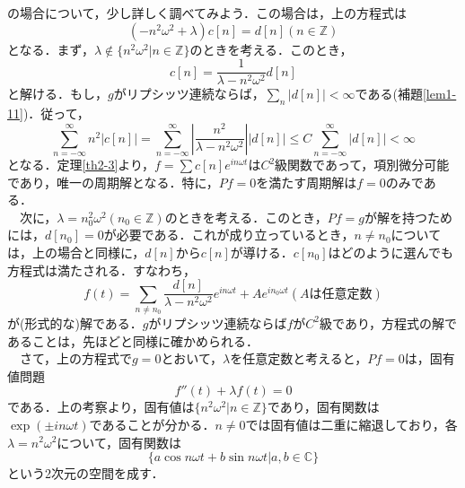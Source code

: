 \documentclass[a4j]{jsbook}
\numberwithin{theorem}{chapter}  %
\begin{document}
の場合について，少し詳しく調べてみよう．この場合は，上の方程式は
\begin{equation*}
    (-n^2\omega^2+\lambda)c[n]=d[n] (n\in\mathbb{Z})
\end{equation*}
となる．まず，\(\lambda\notin\{n^2\omega^2|n\in\mathbb{Z}\}\)のときを考える．このとき，
\begin{equation*}
    c[n]=\frac{1}{\lambda-n^2\omega^2}d[n]
\end{equation*}
と解ける．もし，\(g\)がリプシッツ連続ならば，\(\displaystyle\sum_n |d[n]|<\infty\)である(補題\ref{lem1-11})．従って，
\begin{equation*}
    \sum_{n=-\infty}^\infty n^2|c[n]|=\sum_{n=-\infty}^\infty\left|\frac{n^2}{\lambda-n^2\omega^2}\right||d[n]|\leq C\sum_{n=-\infty}^\infty |d[n]|<\infty
\end{equation*}
となる．定理\ref{th2-3}より，\(\displaystyle f=\sum c[n]e^{in\omega t}\)は\(C^2\)級関数であって，項別微分可能であり，唯一の周期解となる．特に，\(Pf=0\)を満たす周期解は\(f=0\)のみである．\\
　次に，\(\lambda=n_0^2\omega^2(n_0\in\mathbb{Z})\)のときを考える．このとき，\(Pf=g\)が解を持つためには，\(d[n_0]=0\)が必要である．これが成り立っているとき，\(n\neq n_0\)については，上の場合と同様に，\(d[n]\)から\(c[n]\)が導ける．\(c[n_0]\)はどのように選んでも方程式は満たされる．すなわち，
\begin{equation*}
    f(t)=\sum_{n\neq n_0}\frac{d[n]}{\lambda-n^2\omega^2}e^{in\omega t}+Ae^{in_0\omega t}(A\mbox{は任意定数})
\end{equation*}
が(形式的な)解である．\(g\)がリプシッツ連続ならば\(f\)が\(C^2\)級であり，方程式の解であることは，先ほどと同様に確かめられる．\\
　さて，上の方程式で\(g=0\)とおいて，\(\lambda\)を任意定数と考えると，\(Pf=0\)は，固有値問題
\begin{equation*}
    f''(t)+\lambda f(t)=0
\end{equation*}
である．上の考察より，固有値は\(\{n^2\omega^2|n\in\mathbb{Z}\}\)であり，固有関数は\(\exp(\pm in\omega t)\)であることが分かる．\(n\neq 0\)では固有値は二重に縮退しており，各\(\lambda=n^2\omega^2\)について，固有関数は
\begin{equation*}
    \{a\cos n\omega t+b\sin n\omega t|a, b\in\mathbb{C}\}
\end{equation*}
という2次元の空間を成す．
\end{document}
